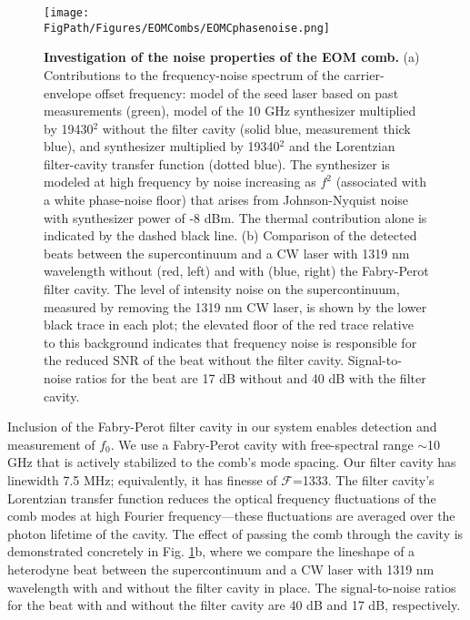 \begin{figure}[htpb]
	\begin{center}
		\texttt{[image: \\FigPath/Figures/EOMCombs/EOMCphasenoise.png]}
	\end{center}
	\caption[Investigation of the noise properties of the EOM comb]{\textbf{Investigation of the noise properties of the EOM comb.}  (a) Contributions to the frequency-noise spectrum of the carrier-envelope offset frequency: model of the seed laser based on past measurements (green), model of the 10 GHz synthesizer multiplied by 19430$^2$ without the filter cavity (solid blue, measurement thick blue), and synthesizer multiplied by 19340$^2$ and the Lorentzian filter-cavity transfer function (dotted blue). The synthesizer is modeled at high frequency by noise increasing as $f^2$ (associated with a white phase-noise floor) that arises from Johnson-Nyquist noise with synthesizer power of -8 dBm. The thermal contribution alone is indicated by the dashed black line. (b) Comparison of the detected beats between the supercontinuum and a CW laser with 1319 nm wavelength without (red, left) and with (blue, right) the Fabry-Perot filter cavity. The level of intensity noise on the supercontinuum, measured by removing the 1319 nm CW laser, is shown by the lower black trace in each plot; the elevated floor of the red trace relative to this background indicates that frequency noise is responsible for the reduced SNR of the beat without the filter cavity. Signal-to-noise ratios for the beat are 17 dB without and 40 dB with the filter cavity.}
	\label{fig:EOMC_noise}
\end{figure} 

Inclusion of the Fabry-Perot filter cavity in our system enables detection and measurement of $f_0$. We use a Fabry-Perot cavity with free-spectral range $\sim$10 GHz that is actively stabilized to the comb's mode spacing. Our filter cavity has linewidth 7.5 MHz; equivalently, it has finesse of $\mathcal{F}$=1333. The filter cavity's Lorentzian transfer function reduces the optical frequency fluctuations of the comb modes at high Fourier frequency---these fluctuations are averaged over the photon lifetime of the cavity. The effect of passing the comb through the cavity is demonstrated concretely in Fig. \ref{fig:EOMC_noise}b, where we compare the lineshape of a heterodyne beat between the supercontinuum and a CW laser with 1319 nm wavelength with and without the filter cavity in place. The signal-to-noise ratios for the beat with and without the filter cavity are 40 dB and 17 dB, respectively.




